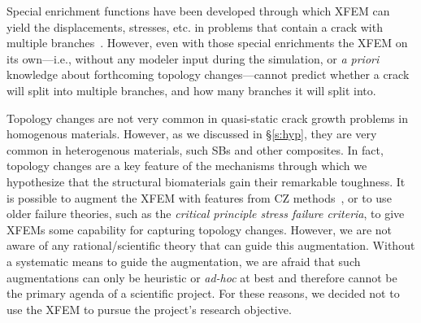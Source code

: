\documentclass[10pt,letterpaper]{article}
\begin{document}
    Special  enrichment functions have been developed through which  XFEM  can yield  the  displacements, stresses, etc.  in  problems that contain a crack with  multiple branches~\cite{daux2000arbitrary,belytschko2001arbitrary}. However, even  with those special enrichments  the XFEM  on its own---i.e., without any modeler input during the simulation, or \textit{a priori} knowledge about forthcoming topology changes---cannot predict whether a crack will split into multiple branches, and how many branches it will split into.

    Topology changes are not very common in quasi-static crack growth problems in homogenous materials. However, as we discussed in \S \ref{s:hyp},  they are very common in heterogenous materials, such SBs and other composites. In fact,  topology changes are a key feature of the  mechanisms  through which we hypothesize that the structural biomaterials  gain their remarkable toughness. It is possible to augment the XFEM with features from CZ methods~\cite{wells2001new,moes2002extended,mariani2003extended}, or to use older failure theories, such as the  \textit{critical principle stress failure criteria}, to give XFEMs some capability  for capturing topology changes. However, we are not aware of any rational/scientific  theory that can guide this augmentation. Without a systematic means  to  guide the augmentation, we are afraid that such augmentations can only be heuristic or \textit{ad-hoc}  at best and therefore cannot be the primary agenda of a scientific project. For these reasons, we decided not to use the XFEM to pursue the project's research objective.


\clearpage
\setcounter{page}{1}
\pagestyle{plain}


\end{document}
